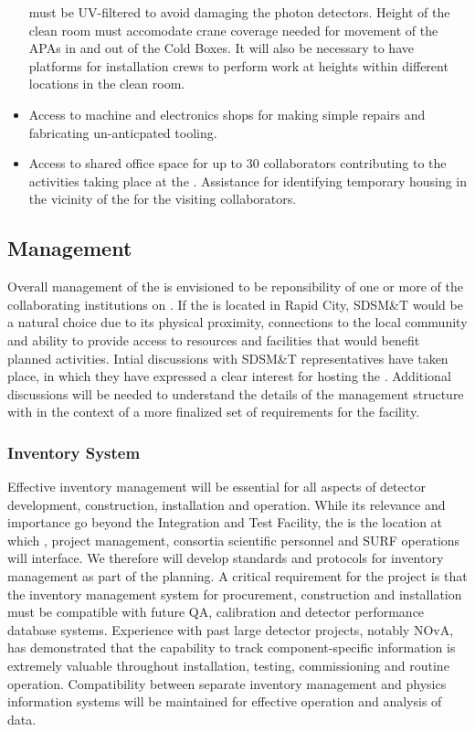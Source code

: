 \begin{itemize}
    must be UV-filtered to avoid damaging the photon detectors.
    Height of the clean room must accomodate crane coverage needed for
    movement of the APAs in and out of the Cold Boxes.  It will also
    be necessary to have platforms for installation crews to perform
    work at heights within different locations in the clean room.
  \item Access to machine and electronics shops for making simple
    repairs and fabricating un-anticpated tooling.
  \item Access to shared office space for up to 30 collaborators
    contributing to the activities taking place at the .
    Assistance for identifying temporary housing in the vicinity of
    the  for the visiting collaborators.
\end{itemize}

\subsection{Management}

Overall management of the  is envisioned to be
reponsibility of one or more of the collaborating institutions on
.  If the  is located in Rapid City, SDSM\&T
would be a natural choice due to its physical proximity, connections
to the local community and ability to provide access to resources and
facilities that would benefit planned  activities.  Intial
discussions with SDSM\&T representatives have taken place, in which
they have expressed a clear interest for hosting the .
Additional discussions will be needed to understand the details of the
 management structure with in the context of a more
finalized set of requirements for the facility.

\subsubsection{Inventory System}

Effective inventory management will be essential for all aspects of
 detector development, construction, installation and
operation.  While its relevance and importance go beyond the
Integration and Test Facility, the  is the location at
which ,  project management, consortia
scientific personnel and SURF operations will interface.  We therefore
will develop standards and protocols for inventory management as part
of the  planning.  A critical requirement for the project
is that the inventory management system for procurement, construction
and installation must be compatible with future QA, calibration and
detector performance database systems.  Experience with past large
detector projects, notably NOvA, has demonstrated that the capability
to track component-specific information is extremely valuable
throughout installation, testing, commissioning and routine operation.
Compatibility between separate inventory management and physics
information systems will be maintained for effective operation and
analysis of  data.
